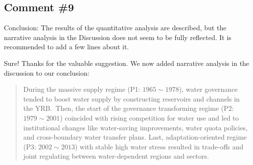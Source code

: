 \subsection{Comment \#9}
\RC{} Conclusion: The results of the quantitative analysis are described, but the narrative analysis in the Discussion does not seem to be fully reflected. It is recommended to add a few lines about it.

\AR{} Sure! Thanks for the valuable suggestion. We now added narrative analysis in the discussion to our conclusion:

\begin{quote}
    During the massive supply regime (P1: $1965 \sim 1978$), water governance tended to boost water supply by constructing reservoirs and channels in the YRB.\
    Then, the start of the governance transforming regime (P2: $1979 \sim 2001$) coincided with rising competition for water use and led to institutional changes like water-saving improvements, water quota policies, and cross-boundary water transfer plans.
    Last, adaptation-oriented regime (P3: $2002 \sim 2013$) with stable high water stress resulted in trade-offs and joint regulating between water-dependent regions and sectors.
\end{quote}
